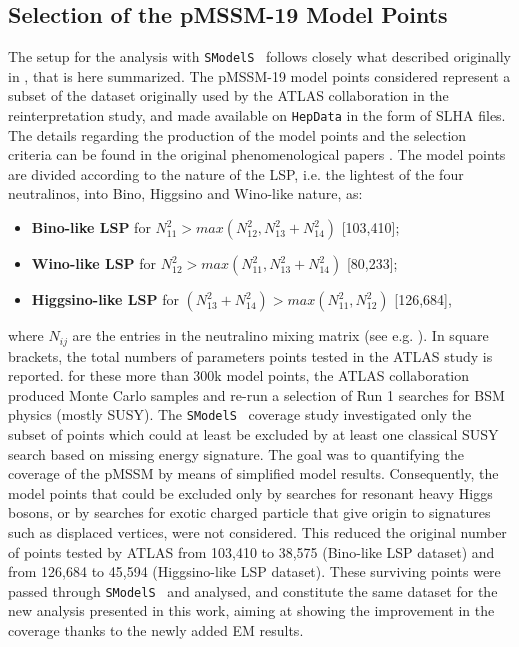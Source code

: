 \documentclass[a4paper,11pt]{article}
\newcommand{\SMO}{\texttt{SModelS\xspace}}
\begin{document}
%
\subsection{Selection of the pMSSM-19 Model Points}
The setup for the analysis with \SMO~ follows closely what described originally in \cite{Ambrogi:2017lov}, that is here summarized. The pMSSM-19 model points considered represent a subset of the dataset originally used by the ATLAS collaboration in the reinterpretation study\cite{Aad:2015baa}, and made available on \texttt{HepData}\cite{ATLASpMSSMhepdata} in the form of SLHA\cite{Skands:2003cj} files. The details regarding the production of the model points and the selection criteria can be found in the original phenomenological papers \cite{Berger:2008cq,CahillRowley:2012cb,CahillRowley:2012kx,Cahill-Rowley:2014twa}.
The model points are divided according to the nature of the LSP, i.e. the lightest of the four neutralinos, into Bino, Higgsino and Wino-like nature, as:
\begin{itemize}
	\item \textbf{Bino-like LSP} for $N_{11}^2 > max(N^2_{12},N^2_{13} + N^2_{14})$ [103,410]; \
	\item \textbf{Wino-like LSP} for $N_{12}^2 > max(N^2_{11},N^2_{13} + N^2_{14})$ [80,233]; \
	\item \textbf{Higgsino-like LSP} for $(N_{13}^2 + N_{14}^2 )  > max(N^2_{11},N^2_{12})$ [126,684],\
\end{itemize}
where $N_{ij}$ are the entries in the neutralino mixing matrix (see e.g. \cite{Martin:1997ns}). In square brackets, the total numbers of parameters points tested in the ATLAS study is reported. for these more than 300k model points, the ATLAS collaboration produced Monte Carlo samples and re-run a selection of Run 1 searches for BSM physics (mostly SUSY). The \SMO~ coverage study investigated only the subset of points which could at least be excluded by at least one classical SUSY search based on missing energy signature. The goal was to quantifying the coverage of the pMSSM by means of simplified model results. Consequently, the model points that could be excluded only by searches for resonant heavy Higgs bosons, or by searches for exotic charged particle that give origin to signatures such as displaced vertices, were not considered.
This reduced the original number of points tested by ATLAS from 103,410 to 38,575 (Bino-like LSP dataset) and from 126,684 to 45,594 (Higgsino-like LSP dataset). These surviving points were passed through \SMO~ and analysed, and constitute the same dataset for the new analysis presented in this work, aiming at showing the improvement in the coverage thanks to the newly added EM results. 
\end{document}
